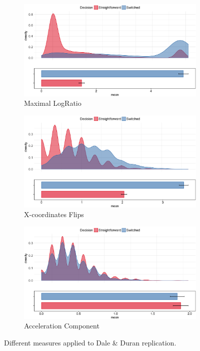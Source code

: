 \documentclass{article}
\begin{document}
\begin{figure}
%
\begin{subfigure}[b]{0.4\textwidth}
\includegraphics[width=\textwidth]{MaxRatio_calibration.png}
\caption{Maximal LogRatio}
\end{subfigure}
%
\begin{subfigure}[b]{0.4\textwidth}
\includegraphics[width=\textwidth]{Xflips_calibration.png}
\caption{X-coordinates Flips}
\end{subfigure}

\begin{subfigure}[b]{0.4\textwidth}
\includegraphics[width=\textwidth]{AC_calibration.png}
\caption{Acceleration Component}
\end{subfigure}

\caption{Different measures applied to Dale \& Duran replication.}
\label{fig:different.measures}

\end{figure}
\end{document}
